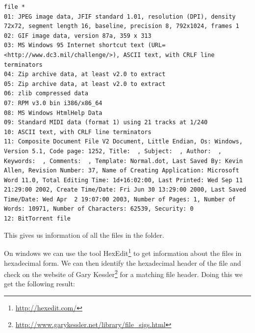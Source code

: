 \documentclass[a4paper,10pt,oneside]{article}
\begin{document}
\begin{lstlisting}[caption=Result from 'file' command]
file *
01: JPEG image data, JFIF standard 1.01, resolution (DPI), density 72x72, segment length 16, baseline, precision 8, 792x1024, frames 1
02: GIF image data, version 87a, 359 x 313
03: MS Windows 95 Internet shortcut text (URL=<http://www.dc3.mil/challenge/>), ASCII text, with CRLF line terminators
04: Zip archive data, at least v2.0 to extract
05: Zip archive data, at least v2.0 to extract
06: zlib compressed data
07: RPM v3.0 bin i386/x86_64
08: MS Windows HtmlHelp Data
09: Standard MIDI data (format 1) using 21 tracks at 1/240
10: ASCII text, with CRLF line terminators
11: Composite Document File V2 Document, Little Endian, Os: Windows, Version 5.1, Code page: 1252, Title:  , Subject:  , Author:  , Keywords:  , Comments:  , Template: Normal.dot, Last Saved By: Kevin Allen, Revision Number: 37, Name of Creating Application: Microsoft Word 11.0, Total Editing Time: 1d+16:02:00, Last Printed: Wed Sep 11 21:29:00 2002, Create Time/Date: Fri Jun 30 13:29:00 2000, Last Saved Time/Date: Wed Apr  2 19:07:00 2003, Number of Pages: 1, Number of Words: 10971, Number of Characters: 62539, Security: 0
12: BitTorrent file
\end{lstlisting}


This gives us information of all the files in the folder.

On windows we can use the tool HexEdit\footnote{\url{http://hexedit.com/}} to get information about the files in hexadecimal form.
We can then identify the hexadecimal header of the file and check on the website of Gary Kessler\footnote{\url{http://www.garykessler.net/library/file_sigs.html}} for a matching file header.
Doing this we get the following result:
\end{document}
